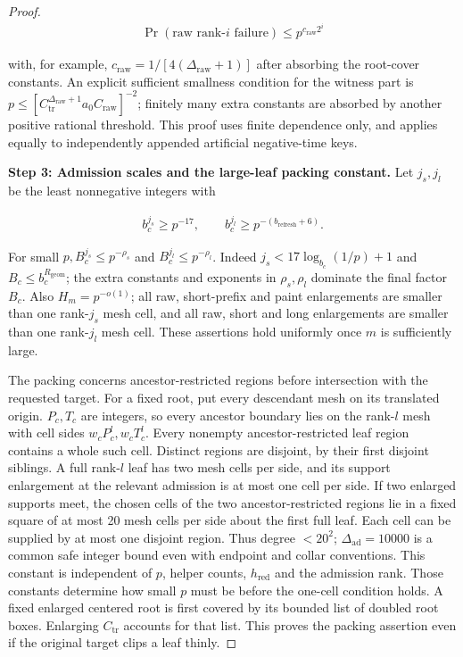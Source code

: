 \begin{proof}
\begin{equation}\label{q1:e12.2}
\begin{gathered}
\Pr(\text{raw rank-}i\text{ failure}) \le  p^{c_{\mathrm{raw}} 2^{i}}
\end{gathered}
\end{equation}

with, for example, \(c_{\mathrm{raw}}=1/[4(\Delta_{\mathrm{raw}}+1)]\) after absorbing the root-cover constants. An explicit sufficient smallness condition for the witness part is \(p \le  [C_{\mathrm{tr}}^{\Delta_{\mathrm{raw}}+1} a_{0} C_{\mathrm{raw}}]^{-2}\); finitely many extra constants are absorbed by another positive rational threshold. This proof uses finite dependence only, and applies equally to independently appended artificial negative-time keys.

\smallskip\noindent\textbf{Step 3: Admission scales and the large-leaf packing constant.} Let \(j_{s},j_{l}\) be the least nonnegative integers with


\[
\begin{gathered}
b_{c}^{j_{s}}\ge p^{-17},\qquad b_{c}^{j_{l}}\ge p^{-(b_{\mathrm{refresh}}+6)}.
\end{gathered}
\]

For small \(p, B_{c}^{j_{s}}\le p^{-\rho_{s}}\) and \(B_{c}^{j_{l}}\le p^{-\rho_{l}}\). Indeed \(j_{s}<17 \log _{b_{c}}(1/p)+1\) and \(B_{c}\le b_{c}^{R_{\mathrm{geom}}}\); the extra constants and exponents in \(\rho_{s},\rho_{l}\) dominate the final factor \(B_{c}\). Also \(H_{m}=p^{-o(1)}\); all raw, short-prefix and paint enlargements are smaller than one rank-\(j_{s}\) mesh cell, and all raw, short and long enlargements are smaller than one rank-\(j_{l}\) mesh cell. These assertions hold uniformly once \(m\) is sufficiently large.

The packing concerns ancestor-restricted regions before intersection with the requested target. For a fixed root, put every descendant mesh on its translated origin. \(P_{c},T_{c}\) are integers, so every ancestor boundary lies on the rank-\(l\) mesh with cell sides \(w_{c} P_{c}^{l},w_{c} T_{c}^{l}\). Every nonempty ancestor-restricted leaf region contains a whole such cell. Distinct regions are disjoint, by their first disjoint siblings. A full rank-\(l\) leaf has two mesh cells per side, and its support enlargement at the relevant admission is at most one cell per side. If two enlarged supports meet, the chosen cells of the two ancestor-restricted regions lie in a fixed square of at most 20 mesh cells per side about the first full leaf. Each cell can be supplied by at most one disjoint region. Thus degree \(<20^{2}\); \(\Delta_{\mathrm{ad}}=10000\) is a common safe integer bound even with endpoint and collar conventions. This constant is independent of \(p\), helper counts, \(h_{\mathrm{red}}\) and the admission rank. Those constants determine how small \(p\) must be before the one-cell condition holds. A fixed enlarged centered root is first covered by its bounded list of doubled root boxes. Enlarging \(C_{\mathrm{tr}}\) accounts for that list. This proves the packing assertion even if the original target clips a leaf thinly.


\end{proof}
